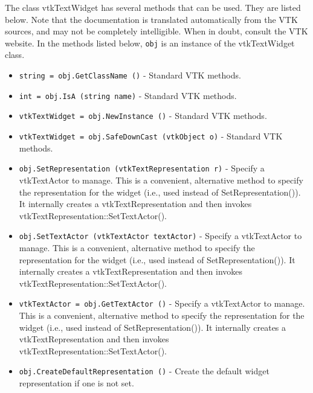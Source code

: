 The class vtkTextWidget has several methods that can be used.
  They are listed below.
Note that the documentation is translated automatically from the VTK sources,
and may not be completely intelligible.  When in doubt, consult the VTK website.
In the methods listed below, \verb|obj| is an instance of the vtkTextWidget class.
\begin{itemize}
\item  \verb|string = obj.GetClassName ()| -  Standard VTK methods.

\item  \verb|int = obj.IsA (string name)| -  Standard VTK methods.

\item  \verb|vtkTextWidget = obj.NewInstance ()| -  Standard VTK methods.

\item  \verb|vtkTextWidget = obj.SafeDownCast (vtkObject o)| -  Standard VTK methods.

\item  \verb|obj.SetRepresentation (vtkTextRepresentation r)| -  Specify a vtkTextActor to manage. This is a convenient, alternative
 method to specify the representation for the widget (i.e., used instead
 of SetRepresentation()). It internally creates a vtkTextRepresentation
 and then invokes vtkTextRepresentation::SetTextActor().

\item  \verb|obj.SetTextActor (vtkTextActor textActor)| -  Specify a vtkTextActor to manage. This is a convenient, alternative
 method to specify the representation for the widget (i.e., used instead
 of SetRepresentation()). It internally creates a vtkTextRepresentation
 and then invokes vtkTextRepresentation::SetTextActor().

\item  \verb|vtkTextActor = obj.GetTextActor ()| -  Specify a vtkTextActor to manage. This is a convenient, alternative
 method to specify the representation for the widget (i.e., used instead
 of SetRepresentation()). It internally creates a vtkTextRepresentation
 and then invokes vtkTextRepresentation::SetTextActor().

\item  \verb|obj.CreateDefaultRepresentation ()| -  Create the default widget representation if one is not set. 

\end{itemize}
